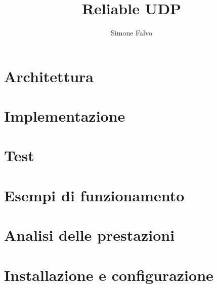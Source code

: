 \documentclass[a4paper,titlepage]{article}
\title{Reliable UDP}
\author{Simone Falvo}
\begin{document}
\maketitle



\tableofcontents
\newpage

\section{Architettura}




\section{Implementazione}








\section{Test}

\section{Esempi di funzionamento}

\section{Analisi delle prestazioni}

\section{Installazione e configurazione}
\end{document}
